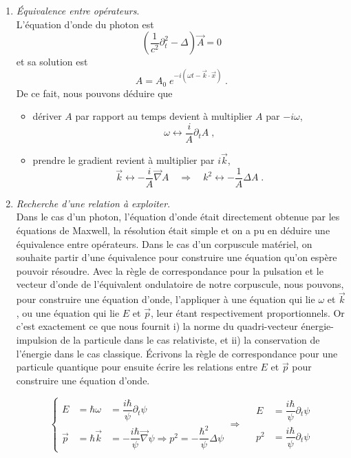 \documentclass[12pt, a4paper]{book}
\begin{document}
\begin{enumerate}[label =  (\alph*)]
\item \textit{Équivalence entre opérateurs}. \\
L'équation d'onde du photon est
$$\left(\dfrac{1}{c^2} \partial_t ^2 - \Delta \right) \vec A = 0$$
et sa solution est $$
A = A_0 \; e^{-i(\omega t - \vec k \cdot \vec x)} \; .$$
De ce fait, nous pouvons déduire que 
\begin{itemize}
\item dériver $A$ par rapport au temps devient à multiplier $A$ par $-i\omega$,
$$\boxed{\omega \longleftrightarrow \dfrac{i}{A} \partial_t A} \; , $$
\item prendre le gradient revient à multiplier par $i\vec k$, 
$$\vec k \longleftrightarrow -\dfrac{i}{A} \vec \nabla A \quad \Rightarrow \quad \boxed{k^2 \longleftrightarrow -\dfrac{1}{A} \Delta A} \; .$$
\end{itemize}

\item \textit{Recherche d'une relation à exploiter}. \\
Dans le cas d'un photon, l'équation d'onde était directement obtenue par les équations de Maxwell, la résolution était simple et on a pu en déduire une équivalence entre opérateurs. Dans le cas d'un corpuscule matériel, on souhaite partir d'une équivalence pour construire une équation qu'on espère pouvoir résoudre. Avec la règle de correspondance pour la pulsation et le vecteur d'onde de l'équivalent ondulatoire de notre corpuscule, nous pouvons, pour construire une équation d'onde, l'appliquer à une équation qui lie $\omega$ et $\vec k$, ou une équation qui lie $E$ et $\vec p$, leur étant respectivement proportionnels. Or c'est exactement ce que nous fournit i) la norme du quadri-vecteur énergie-impulsion de la particule dans le cas relativiste, et ii) la conservation de l'énergie dans le cas classique. Écrivons la règle de correspondance pour une particule quantique pour ensuite écrire les relations entre $E$ et $\vec p$ pour construire une équation d'onde.

\begin{equation} \label{eq:ch2-correspondance}
\left\{ \begin{array}{lll}
E &= \hbar \omega &= \dfrac{i\hbar}{\psi} \partial_t \psi \\
\vec p &= \hbar \vec k &= -\dfrac{i\hbar}{\psi} \vec \nabla \psi \Rightarrow p^2 = -\dfrac{\hbar ^2}{\psi} \Delta \psi
\end{array} \right. \Longrightarrow \quad \boxed{\begin{array}{ll}
E &=\dfrac{i\hbar}{\psi} \partial_t \psi \\
p^2 &=  \dfrac{i\hbar}{\psi} \partial_t \psi
\end{array}}
\end{equation}


\end{enumerate}
\end{document}
